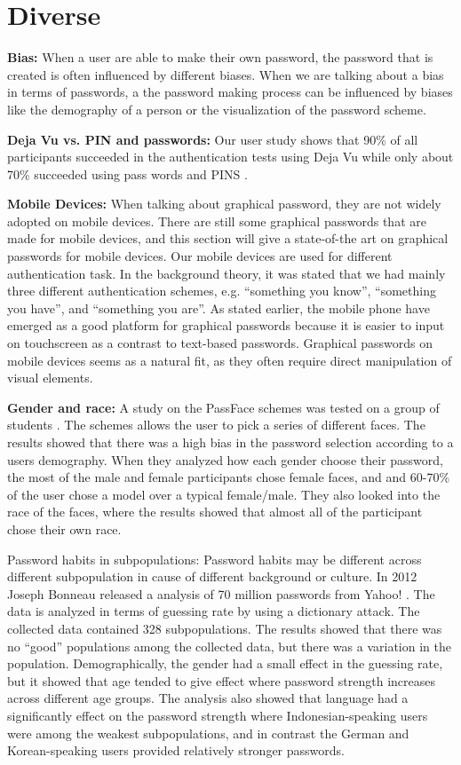 \section{Diverse}

    {\bf Bias:} When a user are able to make their own password, the password that is created is often influenced by different biases.  When we are talking about a bias in terms of passwords, a the password making process can be influenced by biases like the demography of a person or the visualization of the password scheme. 

    {\bf Deja Vu vs. PIN and passwords:} Our user study shows that 90\% of all participants succeeded in the authentication tests using Deja Vu while only about 70\% succeeded using pass words and PINS \cite{DejaVu}.
    
    {\bf Mobile Devices: } When talking about graphical password, they are not widely adopted on mobile devices. There are still some graphical passwords that are made for mobile devices, and this section will give a state-of-the art on graphical passwords for mobile devices.
    Our mobile devices are used for different authentication task. In the background theory, it was stated that we had mainly three different authentication schemes, e.g. ``something you know'', ``something you have'', and ``something you are''.
    As stated earlier, the mobile phone have emerged as a good platform for graphical passwords because it is easier to input on touchscreen as a contrast to text-based passwords. Graphical passwords on mobile devices seems as a natural fit, as they often require direct manipulation of visual elements. 

    {\bf Gender and race:} A study on the PassFace schemes was tested on a group of students \cite{graphical1}. The schemes allows the user to pick a series of different faces. The results showed that there was a high bias in the password selection according to a users demography. When they analyzed how each gender choose their password, the most of the male and female participants chose female faces, and and 60-70\% of the user chose a model over a typical female/male. They also looked into the race of the faces, where the results showed that almost all of the participant chose their own race.

    {Password habits in subpopulations:} Password habits may be different across different subpopulation in cause of different background or culture. In 2012 Joseph Bonneau released a analysis of 70 million passwords from Yahoo! \cite{Bonneau2}. The data is analyzed in terms of guessing rate by using a dictionary attack. The collected data contained 328 subpopulations. The results showed that there was no ``good'' populations among the collected data, but there was a variation in the population. Demographically, the gender had a small effect in the guessing rate, but it showed that age tended to give effect where password strength increases across different age groups. The analysis also showed that language had a significantly effect on the password strength where Indonesian-speaking users were among the weakest subpopulations, and in contrast the German and Korean-speaking users provided relatively stronger passwords. 

